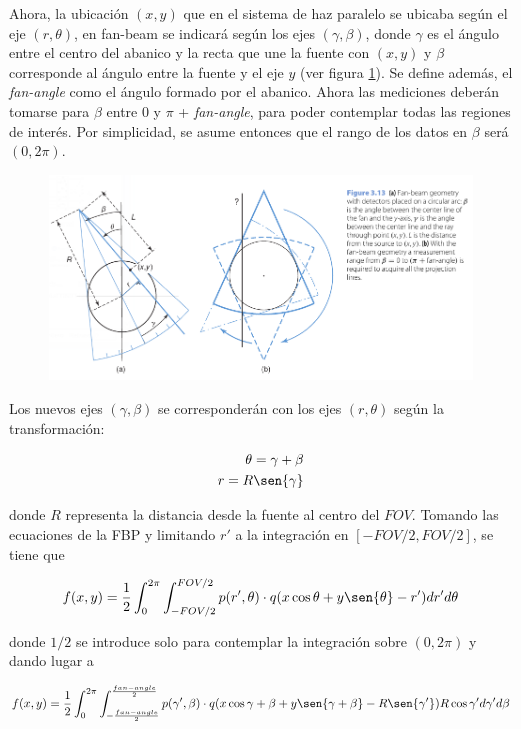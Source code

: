 Ahora, la ubicación $(x,y)$ que en el sistema de haz paralelo se ubicaba según el eje $(r,\theta)$, en fan-beam se indicará según los ejes $(\gamma, \beta)$, donde $\gamma$ es el ángulo entre el centro del abanico y la recta que une la fuente con $(x,y)$ y $\beta$ corresponde al ángulo entre la fuente y el eje $y$ (ver figura \ref{fig:10-2}). Se define además, el \emph{fan-angle} como el ángulo formado por el abanico. Ahora las mediciones deberán tomarse para $\beta$ entre 0 y $\pi$ + \emph{fan-angle}, para poder contemplar todas las regiones de interés. Por simplicidad, se asume entonces que el rango de los datos en $\beta$ será $(0, 2\pi)$.

\begin{figure}
 \centering
 \includegraphics[width=.75\textwidth]{Figuras/cap10-2.png}
 \caption{}
 \label{fig:10-2}
\end{figure}

Los nuevos ejes $(\gamma, \beta)$ se corresponderán con los ejes $(r, \theta)$ según la transformación:

\begin{eqnarray}
 \theta = \gamma + \beta \\
 r = R \sen{\gamma}
\end{eqnarray}

\noindent
donde $R$ representa la distancia desde la fuente al centro del $FOV$. Tomando las ecuaciones de la FBP y limitando $r'$ a la integración en $[-FOV/2, FOV/2]$, se tiene que 

\begin{equation}
 f(x,y) = \frac{1}{2}\int_{0}^{2\pi}{\int_{-FOV/2}^{FOV/2}{p(r',\theta)\cdot q(x \cos{\theta} + y \sen{\theta} - r')dr'}d\theta}
\end{equation}

\noindent
donde $1/2$ se introduce solo para contemplar la integración sobre $(0, 2\pi)$ y dando lugar a 

\begin{equation}
 f(x,y) = \frac{1}{2} \int_{0}^{2\pi}{\int_{-\frac{fan-angle}{2}}^{\frac{fan-angle}{2}}{p(\gamma',\beta)\cdot q(x \cos{\gamma + \beta} + y \sen{\gamma + \beta} - R\sen{\gamma'})R \cos{\gamma'}d\gamma'}d\beta}
\end{equation}

